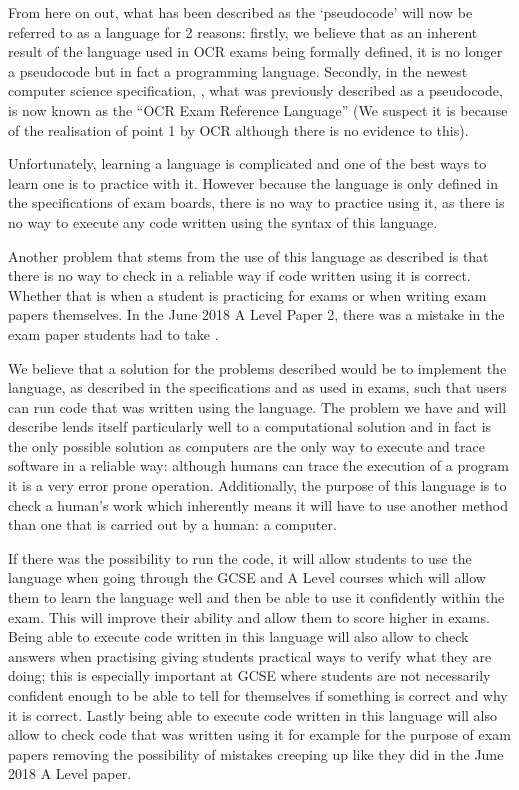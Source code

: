 \documentclass{article}
\begin{document}
From here on out, what has been described as the `pseudocode' will now be
referred to as a language for 2 reasons: firstly, we believe that as an
inherent result of the language used in OCR exams being formally defined, it is
no longer a pseudocode but in fact a programming language. Secondly, in the
newest computer science specification, \textcite{j277}, what was previously
described as a pseudocode, is now known as the ``OCR Exam Reference Language''
(We suspect it is because of the realisation of point 1 by OCR although there
is no evidence to this).

Unfortunately, learning a language is complicated and one of the best ways to
learn one is to practice with it. However because the language is only defined
in the specifications of exam boards, there is no way to practice using it, as
there is no way to execute any code written using the syntax of this language.

Another problem that stems from the use of this language as described is that
there is no way to check in a reliable way if code written using it is correct.
Whether that is when a student is practicing for exams or when writing exam
papers themselves. In the June 2018 A Level Paper 2, there was a mistake in the
exam paper students had to take \cite{ocrpec18}.


We believe that a solution for the problems described would be to implement the
language, as described in the specifications and as used in exams, such that
users can run code that was written using the language. The problem we have and
will describe lends itself particularly well to a computational solution and in
fact is the only possible solution as computers are the only way to execute and
trace software in a reliable way: although humans can trace the execution of a
program it is a very error prone operation. Additionally, the purpose of this
language is to check a human's work which inherently means it will have to use
another method than one that is carried out by a human: a computer.

If there was the possibility to run the code, it will allow students to use the
language when going through the GCSE and A Level courses which will allow them
to learn the language well and then be able to use it confidently within the
exam. This will improve their ability and allow them to score higher in exams.
Being able to execute code written in this language will also allow to check
answers when practising giving students practical ways to verify what they are
doing; this is especially important at GCSE where students are not necessarily
confident enough to be able to tell for themselves if something is correct and
why it is correct. Lastly being able to execute code written in this language
will also allow to check code that was written using it for example for the
purpose of exam papers removing the possibility of mistakes creeping up like
they did in the June 2018 A Level paper.
\end{document}
